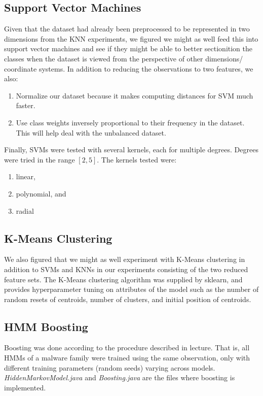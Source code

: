 \documentclass[12pt]{article}
\begin{document}
  \subsection{Support Vector Machines}
  Given that the dataset had already been preprocessed to be represented in two dimensions from the KNN experiments, we figured we might as well feed this into support vector machines and see if they might be able to better sectionition the classes when the dataset is viewed from the perspective of other dimensions/ coordinate systems. In addition to reducing the observations to two features, we also:
\begin{enumerate}
  \item Normalize our dataset because it makes computing distances for SVM much faster.
  \item Use class weights inversely proportional to their frequency in the dataset. This will help deal with the unbalanced dataset.
\end{enumerate}
  Finally, SVMs were tested with several kernels, each for multiple degrees. Degrees were tried in the range $[2, 5]$. 
  The kernels tested were:
  \begin{enumerate}
    \item linear,
    \item polynomial, and
    \item radial
  \end{enumerate}

  \subsection{K-Means Clustering}
  We also figured that we might as well experiment with K-Means clustering in addition to SVMs and KNNs in our experiments consisting of the two reduced feature sets. The K-Means clustering algorithm was supplied by sklearn, and provides hyperparameter tuning on attributes of the model such as the number of random resets of centroids, number of clusters, and initial position of centroids.




\subsection{HMM Boosting}
  Boosting was done according to the procedure described in lecture. That is, all HMMs of a malware family were trained using the same observation, only with different training parameters (random seeds) varying across models. \textit{HiddenMarkovModel.java} and \textit{Boosting.java} are the files where boosting is implemented.
 
\end{document}
